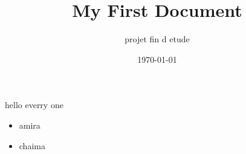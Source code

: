 \documentclass[12]{article}
\title{My First Document}
\author{projet fin d etude}
\date{\today}
\begin{document}
hello everry one 
   \begin{itemize}
     \item amira 
     \item chaima 
   \end{itemize}
\end{document}
